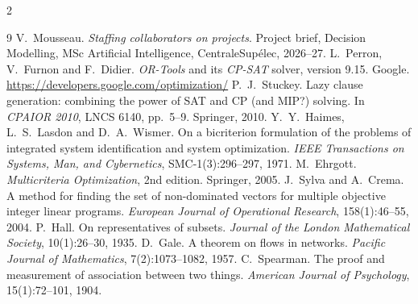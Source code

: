 \documentclass[10pt,a4paper]{article}
\theoremstyle{plain}
\theoremstyle{definition}
\theoremstyle{remark}
\begin{document}
\begin{multicols}{2}
\begin{thebibliography}{9}
\footnotesize
\setlength{\itemsep}{0pt}
 V.~Mousseau. \emph{Staffing collaborators on projects}. Project brief, Decision
  Modelling, MSc Artificial Intelligence, CentraleSup\'elec, 2026--27.
 L.~Perron, V.~Furnon and F.~Didier. \emph{OR-Tools} and its \emph{CP-SAT} solver,
  version 9.15. Google. \url{https://developers.google.com/optimization/}
 P.~J.~Stuckey. Lazy clause generation: combining the power of SAT and CP (and
  MIP?) solving. In \emph{CPAIOR 2010}, LNCS 6140, pp.~5--9. Springer, 2010.
 Y.~Y.~Haimes, L.~S.~Lasdon and D.~A.~Wismer. On a bicriterion formulation of the
  problems of integrated system identification and system optimization. \emph{IEEE Transactions on
  Systems, Man, and Cybernetics}, SMC-1(3):296--297, 1971.
 M.~Ehrgott. \emph{Multicriteria Optimization}, 2nd edition. Springer, 2005.
 J.~Sylva and A.~Crema. A method for finding the set of non-dominated vectors for
  multiple objective integer linear programs. \emph{European Journal of Operational Research},
  158(1):46--55, 2004.
 P.~Hall. On representatives of subsets. \emph{Journal of the London Mathematical
  Society}, 10(1):26--30, 1935.
 D.~Gale. A theorem on flows in networks. \emph{Pacific Journal of Mathematics},
  7(2):1073--1082, 1957.
 C.~Spearman. The proof and measurement of association between two things.
  \emph{American Journal of Psychology}, 15(1):72--101, 1904.
\end{thebibliography}
\end{multicols}
\end{document}
